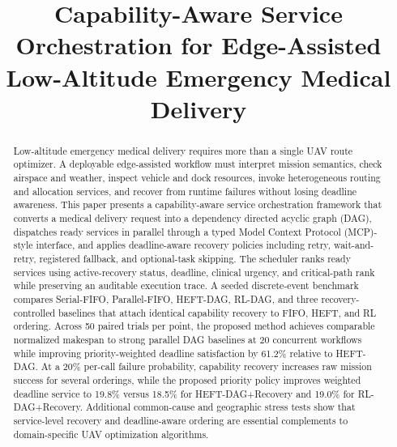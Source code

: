 \documentclass[conference]{IEEEtran}
\begin{document}
\title{Capability-Aware Service Orchestration for Edge-Assisted
Low-Altitude Emergency Medical Delivery}

\author{
}

\maketitle

\begin{abstract}
Low-altitude emergency medical delivery requires more than a single UAV route
optimizer. A deployable edge-assisted workflow must interpret mission
semantics, check airspace and weather, inspect vehicle and dock resources,
invoke heterogeneous routing and allocation services, and recover from
runtime failures without losing deadline awareness. This paper presents a
capability-aware service orchestration framework that converts a medical
delivery request into a dependency directed acyclic graph (DAG), dispatches
ready services in parallel through a typed Model Context Protocol
(MCP)-style interface, and applies deadline-aware recovery policies including
retry, wait-and-retry, registered fallback, and optional-task skipping. The
scheduler ranks ready services using active-recovery status, deadline,
clinical urgency, and critical-path rank while preserving an auditable
execution trace. A seeded discrete-event benchmark compares Serial-FIFO,
Parallel-FIFO, HEFT-DAG, RL-DAG, and three recovery-controlled baselines
that attach identical capability recovery to FIFO, HEFT, and RL ordering.
Across 50 paired trials per point, the proposed method achieves comparable
normalized makespan to strong parallel DAG baselines at 20 concurrent
workflows while improving priority-weighted deadline satisfaction by 61.2\%
relative to HEFT-DAG. At a 20\% per-call failure probability, capability
recovery increases raw mission success for several orderings, while the
proposed priority policy improves weighted deadline service to 19.8\% versus
18.5\% for HEFT-DAG+Recovery and 19.0\% for RL-DAG+Recovery. Additional
common-cause and geographic stress tests show that service-level recovery
and deadline-aware ordering are essential complements to domain-specific UAV
optimization algorithms.
\end{abstract}
\end{document}
